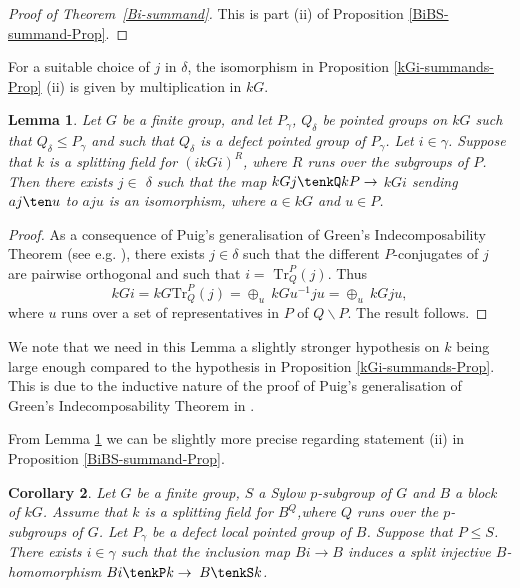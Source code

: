 \documentclass{amsart}
\theoremstyle{plain}\newtheorem{Theorem}{Theorem}[section]
\theoremstyle{plain}\newtheorem{Conjecture}[Theorem]{Conjecture}
\theoremstyle{plain}\newtheorem{Corollary}[Theorem]{Corollary}
\theoremstyle{plain}\newtheorem{Lemma}[Theorem]{Lemma}
\theoremstyle{plain}\newtheorem{Proposition}[Theorem]{Proposition}
\theoremstyle{definition}\newtheorem{Definition}[Theorem]{Definition}
\theoremstyle{definition}\newtheorem{Example}[Theorem]{Example}
\theoremstyle{definition}\newtheorem{Examples}[Theorem]{Examples}
\theoremstyle{definition}\newtheorem{Exercise}[Theorem]{Exercise}
\theoremstyle{definition}\newtheorem{Notation}[Theorem]{Notation}
\theoremstyle{definition}\newtheorem{Remark}[Theorem]{Remark}
\theoremstyle{definition}\newtheorem{Remarks}[Theorem]{Remarks}
\theoremstyle{plain}\newtheorem{Statement}[Theorem]{}
\def\Tr{\mathrm{Tr}}             \def\tenOT{\otimes_{\mathcal{O}T}}
\begin{document}
\begin{proof}[Proof   of Theorem~\ref{Bi-summand}]  
This is  part   (ii)  of  Proposition \ref{BiBS-summand-Prop}.
\end{proof} 
For a suitable choice of $j$ in  $\delta$, the isomorphism in Proposition
\ref{kGi-summands-Prop} (ii) is  given by multiplication in $kG$.

\begin{Lemma} \label{kGi-summand-isomorphism}
Let $G$ be a finite group, and let $P_\gamma$, $Q_\delta$ be pointed groups
on $kG$ such that $Q_\delta\leq P_\gamma$ and such that $Q_\delta$ is
a defect pointed group of $P_\gamma$. Let $i\in \gamma$. 
Suppose that $k$ is a splitting field for $(ikGi)^R$, where $R$ runs over the
subgroups of $P$.
Then there exists $j\in$ $\delta$ such that the map $kGj\tenkQ kP\to$ $kGi$
sending $aj\ten u$ to $aju$ is an isomorphism, where $a\in kG$ and $u\in P$.
\end{Lemma}

\begin{proof}
As a consequence of  Puig's generalisation of Green's Indecomposability Theorem  
(see  e.g. \cite[Corollary 5.12.21]{LiBookII}), there exists $j\in \delta$ such that
the different $P$-conjugates of $j$ are pairwise orthogonal and such that
$i=$ $\Tr^P_Q(j)$. Thus 
$$kGi= kG\Tr^P_Q(j)= \oplus_{u}\ kGu^{-1}ju= \oplus_{u}\ kGju,$$
where $u$ runs over a set of representatives in $P$ of $Q\backslash P$. 
The result follows.
\end{proof}

We note that we need in this Lemma a slightly stronger hypothesis on $k$
 being large enough compared to the hypothesis in Proposition 
\ref{kGi-summands-Prop}. This  is due to the inductive nature of the proof of
Puig's generalisation of Green's Indecomposability Theorem in 
\cite[Theorem 5.12.20]{LiBookII}.


From Lemma \ref{kGi-summand-isomorphism} we can be slightly more
precise regarding statement (ii) in Proposition \ref{BiBS-summand-Prop}.

\begin{Corollary} \label{BjB-split-Cor}
Let $G$ be a finite group, $S$ a Sylow $p$-subgroup of $G$ and $B$ a block
of $kG$.  Assume that $k$ is a splitting field for $B^Q$,where $Q$ runs over the
$p$-subgroups of $G$. Let $P_\gamma$ be a defect local pointed group of $B$. 
Suppose that $P \leq S$.
There exists $i\in \gamma$ such that the inclusion map $Bi\to B$ induces
a split injective $B$-homomorphism $Bi\tenkP k\to$ $B\tenkS k$.
\end{Corollary}
\end{document}
